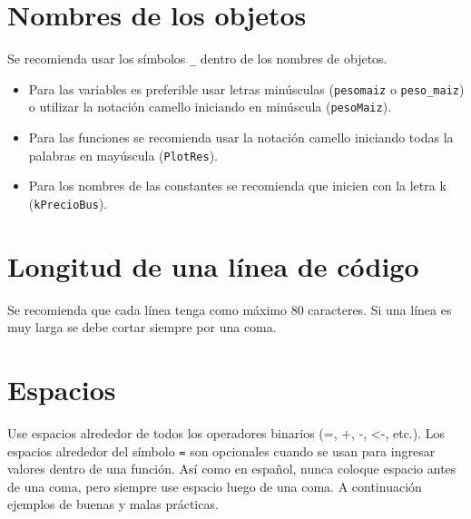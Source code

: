 \documentclass[
]{book}
\providecommand{\tightlist}{%
  \setlength{\itemsep}{0pt}\setlength{\parskip}{0pt}}
\begin{document}
\hypertarget{nombres-de-los-objetos}{%
\section{Nombres de los objetos}\label{nombres-de-los-objetos}}

Se recomienda usar los símbolos \texttt{\_} dentro de los nombres de objetos.

\begin{itemize}
\tightlist
\item
  Para las variables es preferible usar letras minúsculas (\texttt{pesomaiz} o \texttt{peso\_maiz}) o utilizar la notación camello iniciando en minúscula (\texttt{pesoMaiz}).
\item
  Para las funciones se recomienda usar la notación camello iniciando todas la palabras en mayúscula (\texttt{PlotRes}).
\item
  Para los nombres de las constantes se recomienda que inicien con la letra k (\texttt{kPrecioBus}).
\end{itemize}

\hypertarget{longitud-de-una-luxednea-de-cuxf3digo}{%
\section{Longitud de una línea de código}\label{longitud-de-una-luxednea-de-cuxf3digo}}

Se recomienda que cada línea tenga como máximo 80 caracteres. Si una línea es muy larga se debe cortar siempre por una coma.

\hypertarget{espacios}{%
\section{Espacios}\label{espacios}}

Use espacios alrededor de todos los operadores binarios (=, +, -, \textless-, etc.). Los espacios alrededor del símbolo \texttt{=} son opcionales cuando se usan para ingresar valores dentro de una función. Así como en español, nunca coloque espacio antes de una coma, pero siempre use espacio luego de una coma. A continuación ejemplos de buenas y malas prácticas.
\end{document}
